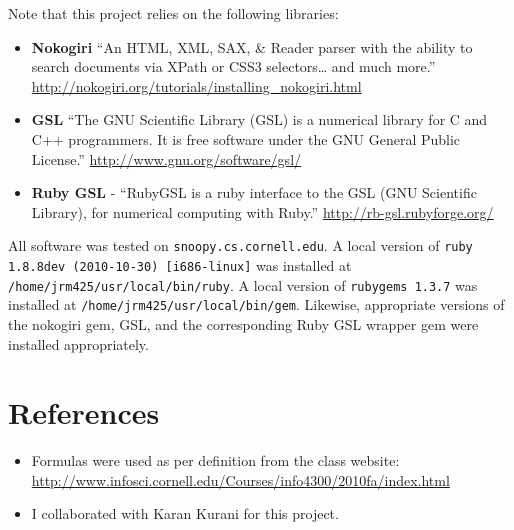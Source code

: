 \documentclass[12pt]{article}
\begin{document}
Note that this project relies on the following libraries:
\begin{itemize}
  \item \textbf{Nokogiri} ``An HTML, XML, SAX, & Reader parser with the ability to search documents via XPath or CSS3 selectors… and much more.'' \url{http://nokogiri.org/tutorials/installing_nokogiri.html}
  \item \textbf{GSL} ``The GNU Scientific Library (GSL) is a numerical library for C and C++ programmers. It is free software under the GNU General Public License.'' \url{http://www.gnu.org/software/gsl/}
  \item \textbf{Ruby GSL} - ``RubyGSL is a ruby interface to the GSL (GNU Scientific Library), for numerical computing with Ruby.'' \url{http://rb-gsl.rubyforge.org/}
\end{itemize}
All software was tested on \texttt{snoopy.cs.cornell.edu}. A local version of \texttt{ruby 1.8.8dev (2010-10-30) [i686-linux]} was installed at \texttt{/home/jrm425/usr/local/bin/ruby}. A local version of \texttt{rubygems 1.3.7} was installed at \texttt{/home/jrm425/usr/local/bin/gem}. Likewise, appropriate versions of the nokogiri gem, GSL, and the corresponding Ruby GSL wrapper gem were installed appropriately.
\newpage
\section{References} %
\label{sec:references}
\begin{itemize}
  \item Formulas were used as per definition from the class website: \url{http://www.infosci.cornell.edu/Courses/info4300/2010fa/index.html}
  \item I collaborated with Karan Kurani for this project.
\end{itemize}
\end{document}
